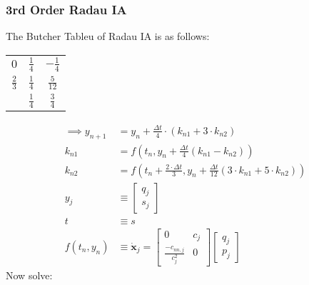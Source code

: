 \documentclass{article}
\begin{document}
\subsubsection{3rd Order Radau IA}
The Butcher Tableu of Radau IA is as follows:
\begin{center}
	\begin{tabular}{c|c c}
		$0$           & $\frac{1}{4}$ & $-\frac{1}{4}$ \\
		$\frac{2}{3}$ & $\frac{1}{4}$ & $\frac{5}{12}$ \\
		\hline
		              & $\frac{1}{4}$ & $\frac{3}{4}$
	\end{tabular}
\end{center}
\begin{align*}
	\implies y_{n+1} & = y_{n} + \frac{\Delta t}{4}\cdot (k_{n1} + 3\cdot k_{n2})                                                                        \\
	k_{n1}           & = f\left(t_n, y_n + \frac{\Delta t}{4}({k_{n1} - k_{n2}})\right)                                                                  \\
	k_{n2}           & = f\left(t_n + \frac{2\cdot\Delta t}{3}, y_n + \frac{\Delta t}{12}({3\cdot k_{n1} + 5\cdot k_{n2}})\right)                        \\
	y_{j}            & \equiv\begin{bmatrix}q_j \\ s_j \end{bmatrix}                                                                                     \\
	t                & \equiv s                                                                                                                          \\
	f(t_n, y_n)      & \equiv \dot{\bm{x}}_j=\begin{bmatrix} 0 & c_j \\ \frac{-c_{nn, j}}{c^2_j} & 0\end{bmatrix}\begin{bmatrix} q_j \\ p_j\end{bmatrix}
\end{align*}
Now solve:
\end{document}
